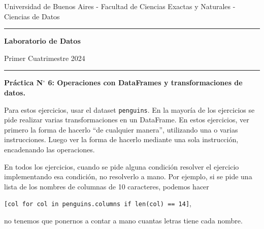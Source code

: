\documentclass[a4paper,11pt]{article}
\theoremstyle{definition}
\begin{document}
\centerline{{\small Universidad de Buenos Aires - Facultad de Ciencias Exactas y Naturales - Ciencias de Datos}}

\vskip 0.2cm

\hrule

\vskip 0.2cm

 \centerline{{\bf\Large{\sc Laboratorio de Datos}}}

 \vskip 0.2cm

 \centerline{\ttfamily Primer Cuatrimestre 2024}

\vskip 0.2cm

 \hrule

 \bigskip
 \centerline{\bf Práctica N$^\circ$ 6: Operaciones con DataFrames y transformaciones de datos.}
 \bigskip



Para estos ejercicios, usar el dataset \lstinline{penguins}. En la mayoría de los ejercicios se pide realizar varias transformaciones en un DataFrame. En estos ejercicios, ver primero la forma de hacerlo ``de cualquier manera'', utilizando una o varias instrucciones. Luego ver la forma de hacerlo mediante una sola instrucción, encadenando las operaciones.

En todos los ejercicios, cuando se pide alguna condición resolver el ejercicio implementando esa condición, no resolverlo a mano. Por ejemplo, si se pide una lista de los nombres de columnas de 10 caracteres, podemos hacer

\lstinline{[col for col in penguins.columns if len(col) == 14]},

no tenemos que ponernos a contar a mano cuantas letras tiene cada nombre.
\end{document}
